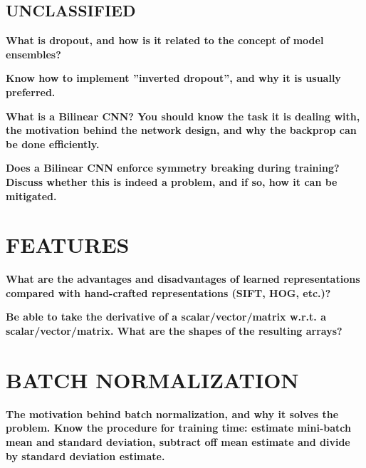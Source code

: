 \documentclass[10pt,letterpaper]{article}
\begin{document}
\subsection{UNCLASSIFIED}

\subitem \textbf{ What is dropout, and how is it related to the concept of model ensembles?}
\begin{solution}
\end{solution}

\subitem \textbf{ Know how to implement ”inverted dropout”, and why it is usually preferred.}
\begin{solution}
\end{solution}

\subitem \textbf{ What is a Bilinear CNN? You should know the task it is dealing with, the motivation behind the network design, and why the backprop can be done efficiently.}
\begin{solution}
\end{solution}
\subitem \textbf{ Does a Bilinear CNN enforce symmetry breaking during training? Discuss whether this is indeed a problem, and if so, how it can be mitigated.}
\begin{solution}
\end{solution}

\section{FEATURES}
\subitem \textbf{ What are the advantages and disadvantages of learned representations compared with hand-crafted representations (SIFT, HOG, etc.)?}
\begin{solution}
\end{solution}

\subitem \textbf{ Be able to take the derivative of a scalar/vector/matrix w.r.t. a scalar/vector/matrix. What are the shapes of the resulting arrays? }
\begin{solution}
\end{solution}


\section{BATCH NORMALIZATION}
\subitem \textbf{ The motivation behind batch normalization, and why it solves the problem. Know the procedure for training time: estimate mini-batch mean and standard deviation, subtract off mean estimate and divide by standard deviation estimate.}
\begin{solution}
\end{solution}
\end{document}

